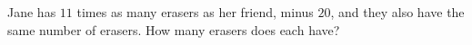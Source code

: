 Jane has $11$ times as many erasers as her friend, minus $20$, and they also have the same number of erasers. How many erasers does each have?
